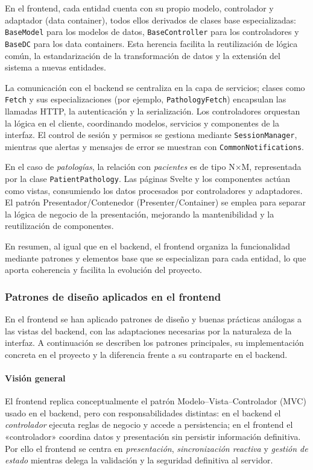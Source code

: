 \documentclass[12pt, a4paper]{article}
\begin{document}
En el frontend, cada entidad cuenta con su propio modelo, controlador y adaptador (data container), todos ellos derivados de clases base especializadas: \texttt{BaseModel} para los modelos de datos, \texttt{BaseController} para los controladores y \texttt{BaseDC} para los data containers. Esta herencia facilita la reutilización de lógica común, la estandarización de la transformación de datos y la extensión del sistema a nuevas entidades.

La comunicación con el backend se centraliza en la capa de servicios; clases como \texttt{Fetch} y sus especializaciones (por ejemplo, \texttt{PathologyFetch}) encapsulan las llamadas HTTP, la autenticación y la serialización. Los controladores orquestan la lógica en el cliente, coordinando modelos, servicios y componentes de la interfaz. El control de sesión y permisos se gestiona mediante \texttt{SessionManager}, mientras que alertas y mensajes de error se muestran con \texttt{CommonNotifications}.

En el caso de \emph{patologías}, la relación con \emph{pacientes} es de tipo N×M, representada por la clase \texttt{PatientPathology}. Las páginas Svelte y los componentes actúan como vistas, consumiendo los datos procesados por controladores y adaptadores. El patrón Presentador/Contenedor (Presenter/Container) se emplea para separar la lógica de negocio de la presentación, mejorando la mantenibilidad y la reutilización de componentes.

En resumen, al igual que en el backend, el frontend organiza la funcionalidad mediante patrones y elementos base que se especializan para cada entidad, lo que aporta coherencia y facilita la evolución del proyecto.

\subsubsection{Patrones de diseño aplicados en el frontend}

En el frontend se han aplicado patrones de diseño y buenas prácticas análogas a las vistas del backend, con las adaptaciones necesarias por la naturaleza de la interfaz. A continuación se describen los patrones principales, su implementación concreta en el proyecto y la diferencia frente a su contraparte en el backend.

\paragraph{Visión general}  
El frontend replica conceptualmente el patrón Modelo–Vista–Controlador (MVC) usado en el backend, pero con responsabilidades distintas: en el backend el \emph{controlador} ejecuta reglas de negocio y accede a persistencia; en el frontend el «controlador» coordina datos y presentación sin persistir información definitiva. Por ello el frontend se centra en \emph{presentación}, \emph{sincronización reactiva} y \emph{gestión de estado} mientras delega la validación y la seguridad definitiva al servidor.
\end{document}
